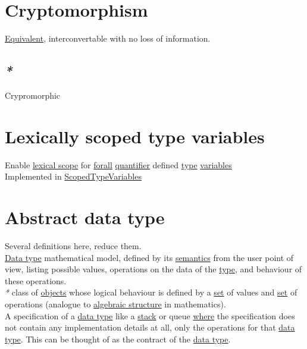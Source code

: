 \documentclass[a4paper,14pt,oneside]{book}
\begin{document}
\chapter{\label{org2eaafc3}Cryptomorphism}
\label{sec:org5166f28}

\hyperref[org5031093]{Equivalent}, interconvertable with no loss of information.\\

\section{\emph{*}}
\label{sec:org9683d26}

\label{org5d9cf31}Crypromorphic\\

\chapter{\label{org707393f}Lexically scoped type variables}
\label{sec:org6b91d7a}

Enable \hyperref[org8ceaf8b]{lexical scope} for \hyperref[org09dc902]{forall} \hyperref[org3ec5710]{quantifier} defined \hyperref[org35b9249]{type} \hyperref[org0f938c0]{variables}\\

Implemented in \hyperref[orgd2a7b4b]{ScopedTypeVariables}\\

\chapter{\label{orgb971030}Abstract data type}
\label{sec:orgccd635c}

Several definitions here, reduce them.\\

\hyperref[org5fd92b4]{Data type} mathematical model, defined by its \hyperref[org7f4fabd]{semantics} from the user point of view, listing possible values, operations on the data of the \hyperref[org35b9249]{type}, and behaviour of these operations.\\

\emph{*} class of \hyperref[org67f2abd]{objects} whose logical behaviour is defined by a \hyperref[orgc6fbcf3]{set} of values and \hyperref[orgc6fbcf3]{set} of operations (analogue to \hyperref[orgbf3401b]{algebraic structure} in mathematics).\\

A specification of a \hyperref[org5fd92b4]{data type} like a \hyperref[org2b65b14]{stack} or queue \hyperref[org12b3f26]{where} the specification does not contain any implementation details at all, only the operations for that \hyperref[org5fd92b4]{data type}. This can be thought of as the contract of the \hyperref[org5fd92b4]{data type}.\\
\end{document}

